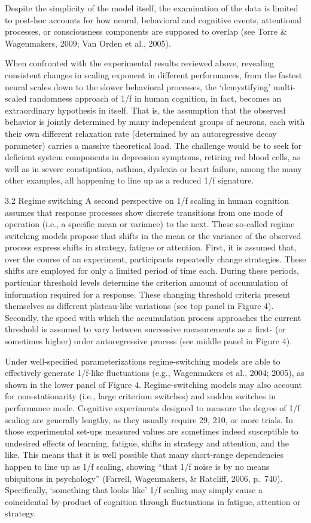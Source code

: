 \documentclass[12pt,]{book}
\begin{document}
Despite the simplicity of the model itself, the examination of the data is limited to post-hoc accounts for how neural, behavioral and cognitive events, attentional processes, or consciousness components are supposed to overlap (see Torre \& Wagenmakers, 2009; Van Orden et al., 2005).

When confronted with the experimental results reviewed above, revealing consistent changes in scaling exponent in different performances, from the fastest neural scales down to the slower behavioral processes, the `demystifying' multi-scaled randomness approach of 1/f in human cognition, in fact, becomes an extraordinary hypothesis in itself. That is, the assumption that the observed behavior is jointly determined by many independent groups of neurons, each with their own different relaxation rate (determined by an autoregressive decay parameter) carries a massive theoretical load. The challenge would be to seek for deficient system components in depression symptoms, retiring red blood cells, as well as in severe constipation, asthma, dyslexia or heart failure, among the many other examples, all happening to line up as a reduced 1/f signature.

3.2 Regime switching
A second perspective on 1/f scaling in human cognition assumes that response processes show discrete transitions from one mode of operation (i.e., a specific mean or variance) to the next. These so-called regime switching models propose that shifts in the mean or the variance of the observed process express shifts in strategy, fatigue or attention. First, it is assumed that, over the course of an experiment, participants repeatedly change strategies. These shifts are employed for only a limited period of time each. During these periods, particular threshold levels determine the criterion amount of accumulation of information required for a response. These changing threshold criteria present themselves as different plateau-like variations (see top panel in Figure 4). Secondly, the speed with which the accumulation process approaches the current threshold is assumed to vary between successive measurements as a first- (or sometimes higher) order autoregressive process (see middle panel in Figure 4).

Under well-specified parameterizations regime-switching models are able to effectively generate 1/f-like fluctuations (e.g., Wagenmakers et al., 2004; 2005), as shown in the lower panel of Figure 4. Regime-switching models may also account for non-stationarity (i.e., large criterium switches) and sudden switches in performance mode. Cognitive experiments designed to measure the degree of 1/f scaling are generally lengthy, as they usually require 29, 210, or more trials. In those experimental set-ups measured values are sometimes indeed susceptible to undesired effects of learning, fatigue, shifts in strategy and attention, and the like. This means that it is well possible that many short-range dependencies happen to line up as 1/f scaling, showing ``that 1/f noise is by no means ubiquitous in psychology'' (Farrell, Wagenmakers, \& Ratcliff, 2006, p.~740). Specifically, `something that looks like' 1/f scaling may simply cause a coincidental by-product of cognition through fluctuations in fatigue, attention or strategy.
\end{document}
